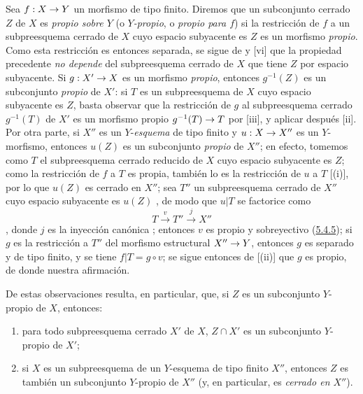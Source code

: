 \documentclass[oneside,10pt]{amsart}
\makeatletter
\newcommand{\ega@arrow}[2]{\mathchoice{#1}{#2}{#2}{#2}}
\renewcommand{\to}{\ega@arrow{\longrightarrow}{\rightarrow}}
\let\EGAOriginalLabel\label
\renewcommand{\label}[1]{\phantomsection\EGAOriginalLabel{#1}}
\makeatother
\begin{document}
\begin{env}[5.4.10]
\label{II.5.4.10-fr}
Sea $f:X\to Y$ un morfismo de tipo finito.
Diremos que un subconjunto cerrado $Z$ de $X$ es \emph{propio sobre $Y$} (o \emph{$Y$-propio}, o \emph{propio para $f$}) si la restricción de $f$ a un subpreesquema cerrado de $X$ cuyo espacio subyacente es $Z$  es un morfismo \emph{propio}.
Como esta restricción es entonces separada, se sigue de  y [vi] que la propiedad precedente \emph{no depende} del subpreesquema cerrado de $X$ que tiene $Z$ por espacio subyacente.
Si $g:X'\to X$ es un morfismo \emph{propio}, entonces $g^{-1}(Z)$ es un subconjunto \emph{propio} de $X'$:
si $T$ es un subpreesquema de $X$ cuyo espacio subyacente es $Z$, basta observar que la restricción de $g$ al subpreesquema cerrado $g^{-1}(T)$ de $X'$ es un morfismo propio $g^{-1}(T)\to T$ por [iii], y aplicar después [ii].
Por otra parte, si $X''$ es un $Y$-\emph{esquema} de tipo finito y $u:X\to X''$ es un $Y$-morfismo, entonces $u(Z)$ es un subconjunto \emph{propio} de $X''$;
en efecto, tomemos como $T$ el subpreesquema cerrado reducido de $X$ cuyo espacio subyacente es $Z$;
como la restricción de $f$ a $T$ es propia, también lo es la restricción de $u$ a $T$ [(i)], por lo que $u(Z)$ es cerrado en $X''$;
sea $T''$ un subpreesquema cerrado de $X''$ cuyo espacio subyacente es $u(Z)$ , de modo que $u|T$ se factorice como \[
  T\xrightarrow{v}T''\xrightarrow{j}X''
\], donde $j$ es la inyección canónica ; entonces $v$ es propio y sobreyectivo (\hyperref[II.5.4.5-fr]{5.4.5});
si $g$ es la restricción a $T''$ del morfismo estructural $X''\to Y$, entonces $g$ es separado y de tipo finito, y se tiene $f|T=g\circ v$;
se sigue entonces de [(ii)] que $g$ es propio, de donde nuestra afirmación.
\end{env}

De estas observaciones resulta, en particular, que, si $Z$ es un subconjunto $Y$-propio de $X$, entonces:
\begin{enumerate}
  \item para todo subpreesquema cerrado $X'$ de $X$, $Z\cap X'$ es un subconjunto $Y$-propio de $X'$;
  \item si $X$ es un subpreesquema de un $Y$-esquema de tipo finito $X''$, entonces $Z$ es también un subconjunto $Y$-propio de $X''$ (y, en particular, es \emph{cerrado en $X''$}).
\end{enumerate}
\end{document}
